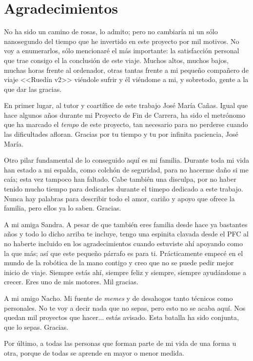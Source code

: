 \thispagestyle{plain}			%
\section*{Agradecimientos}

No ha sido un camino de rosas, lo admito; pero no cambiaría ni un sólo nanosegundo del tiempo que he invertido en este proyecto por mil motivos. No voy a enumerarlos, sólo mencionaré el más importante: la satisfacción personal que trae consigo el la conclusión de este viaje. Muchos altos, muchos bajos, muchas horas frente al ordenador, otras tantas frente a mi pequeño compañero de viaje <<Ruedín v2>> viéndole sufrir y él viéndome a mi, y sobretodo, gente a la que dar las gracias.

En primer lugar, al tutor y coartífice de este trabajo José María Cañas. Igual que hace algunos años durante mi Proyecto de Fin de Carrera, ha sido el metrónomo que ha marcado el \textit{tempo} de este proyecto, tan necesario para no perderse cuando las dificultades afloran. Gracias por tu tiempo y tu por infinita paciencia, José María.

Otro pilar fundamental de lo conseguido aquí es mi familia. Durante toda mi vida han estado a mi espalda, como colchón de seguridad, para no hacerme daño si me caía; esta vez tampoco han faltado. Cabe también una disculpa, por no haber tenido mucho tiempo para dedicarles durante el timepo dedicado a este trabajo. Nunca hay palabras para describir todo el amor, cariño y apoyo que ofrece la familia, pero ellos ya lo saben. Gracias.

A mi amiga Sandra. A pesar de que también eres familia desde hace ya bastantes años y todo lo dicho arriba te incluye, tengo una espinita clavada desde el PFC al no haberte incluido en los agradecimientos cuando estuviste ahí apoyando como la que más; así que este pequeño párrafo es para ti. Prácticamente empecé en el mundo de la robótica de la mano contigo y creo que no se puede pedir mejor inicio de viaje. Siempre estás ahí, siempre feliz y siempre, siempre ayudándome a crecer. Eres uno de mis motores. Mil gracias.

A mi amigo Nacho. Mi fuente de \textit{memes} y de desahogos tanto técnicos como personales. No te voy a decir nada que no sepas, pero esto no se acaba aquí. Nos quedan mil proyectos que hacer... estás avisado. Esta batalla ha sido conjunta, que lo sepas. Gracias.

Por último, a todas las personas que forman parte de mi vida de una forma u otra, porque de todas se aprende en mayor o menor medida.



\vspace{1.5cm}

\newpage				%
\thispagestyle{empty}
\mbox{}